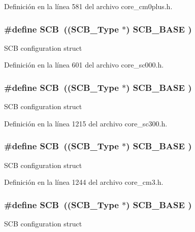 Definición en la línea 581 del archivo core\+\_\+cm0plus.\+h.

\subsubsection[{\texorpdfstring{S\+CB}{SCB}}]{\setlength{\rightskip}{0pt plus 5cm}\#define S\+CB~(({\bf S\+C\+B\+\_\+\+Type}       $\ast$)     {\bf S\+C\+B\+\_\+\+B\+A\+SE}      )}\hypertarget{group___c_m_s_i_s__core__base_gaaaf6477c2bde2f00f99e3c2fd1060b01}{}\label{group___c_m_s_i_s__core__base_gaaaf6477c2bde2f00f99e3c2fd1060b01}
S\+CB configuration struct 

Definición en la línea 601 del archivo core\+\_\+sc000.\+h.

\subsubsection[{\texorpdfstring{S\+CB}{SCB}}]{\setlength{\rightskip}{0pt plus 5cm}\#define S\+CB~(({\bf S\+C\+B\+\_\+\+Type}       $\ast$)     {\bf S\+C\+B\+\_\+\+B\+A\+SE}      )}\hypertarget{group___c_m_s_i_s__core__base_gaaaf6477c2bde2f00f99e3c2fd1060b01}{}\label{group___c_m_s_i_s__core__base_gaaaf6477c2bde2f00f99e3c2fd1060b01}
S\+CB configuration struct 

Definición en la línea 1215 del archivo core\+\_\+sc300.\+h.

\subsubsection[{\texorpdfstring{S\+CB}{SCB}}]{\setlength{\rightskip}{0pt plus 5cm}\#define S\+CB~(({\bf S\+C\+B\+\_\+\+Type}       $\ast$)     {\bf S\+C\+B\+\_\+\+B\+A\+SE}      )}\hypertarget{group___c_m_s_i_s__core__base_gaaaf6477c2bde2f00f99e3c2fd1060b01}{}\label{group___c_m_s_i_s__core__base_gaaaf6477c2bde2f00f99e3c2fd1060b01}
S\+CB configuration struct 

Definición en la línea 1244 del archivo core\+\_\+cm3.\+h.

\subsubsection[{\texorpdfstring{S\+CB}{SCB}}]{\setlength{\rightskip}{0pt plus 5cm}\#define S\+CB~(({\bf S\+C\+B\+\_\+\+Type}       $\ast$)     {\bf S\+C\+B\+\_\+\+B\+A\+SE}      )}\hypertarget{group___c_m_s_i_s__core__base_gaaaf6477c2bde2f00f99e3c2fd1060b01}{}\label{group___c_m_s_i_s__core__base_gaaaf6477c2bde2f00f99e3c2fd1060b01}
S\+CB configuration struct 

